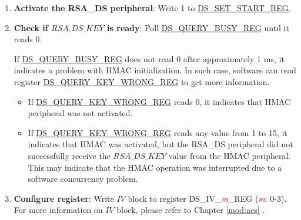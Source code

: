 \documentclass[main\_\_EN.tex]{subfiles}
\begin{document}
\begin{enumerate}

    \item {\bfseries Activate the RSA\_DS peripheral}: Write 1 to \hyperref[regdesc:DSSETSTARTREG]{DS\_SET\_START\_REG}.

    \item {\bfseries Check if \begin{math}RSA\_DS\_KEY\end{math} is ready}: Poll \hyperref[regdesc:DSQUERYBUSYREG]{DS\_QUERY\_BUSY\_REG} until it reads 0.

   If \hyperref[regdesc:DSQUERYBUSYREG]{DS\_QUERY\_BUSY\_REG} does not read 0 after approximately 1 ms, it indicates a problem with HMAC initialization. In such case, software can read register
    \hyperref[regdesc:DSQUERYKEYWRONGREG]{DS\_QUERY\_KEY\_WRONG\_REG} to get more information.

    \begin{itemize}

        \item If \hyperref[regdesc:DSQUERYKEYWRONGREG]{DS\_QUERY\_KEY\_WRONG\_REG} reads 0, it indicates that HMAC peripheral was not activated.

        \item If \hyperref[regdesc:DSQUERYKEYWRONGREG]{DS\_QUERY\_KEY\_WRONG\_REG} reads any value from 1 to 15, it indicates that HMAC was activated, but the RSA\_DS peripheral did not successfully receive the \begin{math}RSA\_DS\_KEY\end{math} value from the HMAC peripheral. This may indicate that the HMAC operation was interrupted due to a software concurrency problem.

    \end{itemize}

    \item {\bfseries Configure register}: Write \begin{math}IV\end{math} block to register DS\_IV\_\textcolor{red}{\it{m}}\_REG (\textcolor{red}{\it{m}}: 0-3). For more information on \begin{math}IV\end{math} block, please refer to Chapter \ref{mod:aes} \textit{}.


\end{enumerate}
\end{document}
